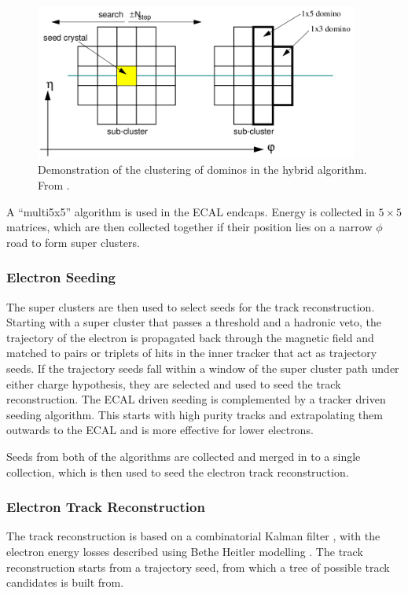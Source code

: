 \begin{figure}[htb]
  \centering
  \includegraphics[width=0.95\textwidth]{hybridalgo}
  \caption{Demonstration of the clustering of dominos in the hybrid algorithm.
           From \cite{eECAL}.}
  \label{fig:hybrid}
\end{figure}

A ``multi5x5'' algorithm is used in the ECAL endcaps. Energy is collected in
$5\times5$ matrices, which are then collected together if their position lies on
a narrow $\phi$ road to form super clusters.

\subsubsection{Electron Seeding}
The super clusters are then used to select seeds for the track reconstruction.
Starting with a super cluster that passes a \pt threshold and a hadronic veto,
the trajectory of the electron is propagated back through the magnetic field and
matched to pairs or triplets of hits in the inner tracker that act as trajectory
seeds.  If the trajectory seeds fall within a window of the super cluster path
under either charge hypothesis, they are selected and used to seed the track
reconstruction.  The ECAL driven seeding is complemented by a tracker driven
seeding algorithm.  This starts with high purity tracks and extrapolating them
outwards to the ECAL and is more effective for lower \pt electrons.

Seeds from both of the algorithms are collected and merged in to a single
collection, which is then used to seed the electron track reconstruction.

\subsubsection{Electron Track Reconstruction}
The track reconstruction is based on a combinatorial Kalman filter \cite{kalman},
with the electron energy losses described using Bethe Heitler
modelling \cite{bethe}.
The track reconstruction starts from a trajectory seed, from which a tree of
possible track candidates is built from. 

